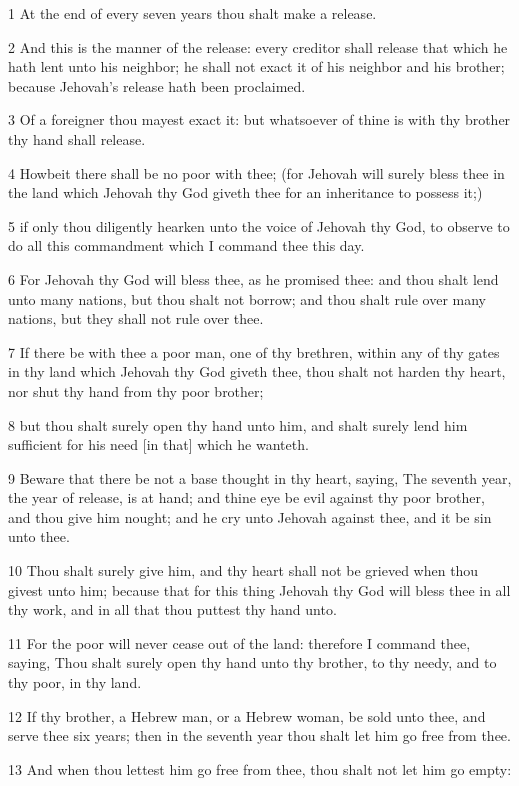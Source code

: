 \par 1 At the end of every seven years thou shalt make a release.
\par 2 And this is the manner of the release: every creditor shall release that which he hath lent unto his neighbor; he shall not exact it of his neighbor and his brother; because Jehovah's release hath been proclaimed.
\par 3 Of a foreigner thou mayest exact it: but whatsoever of thine is with thy brother thy hand shall release.
\par 4 Howbeit there shall be no poor with thee; (for Jehovah will surely bless thee in the land which Jehovah thy God giveth thee for an inheritance to possess it;)
\par 5 if only thou diligently hearken unto the voice of Jehovah thy God, to observe to do all this commandment which I command thee this day.
\par 6 For Jehovah thy God will bless thee, as he promised thee: and thou shalt lend unto many nations, but thou shalt not borrow; and thou shalt rule over many nations, but they shall not rule over thee.
\par 7 If there be with thee a poor man, one of thy brethren, within any of thy gates in thy land which Jehovah thy God giveth thee, thou shalt not harden thy heart, nor shut thy hand from thy poor brother;
\par 8 but thou shalt surely open thy hand unto him, and shalt surely lend him sufficient for his need [in that] which he wanteth.
\par 9 Beware that there be not a base thought in thy heart, saying, The seventh year, the year of release, is at hand; and thine eye be evil against thy poor brother, and thou give him nought; and he cry unto Jehovah against thee, and it be sin unto thee.
\par 10 Thou shalt surely give him, and thy heart shall not be grieved when thou givest unto him; because that for this thing Jehovah thy God will bless thee in all thy work, and in all that thou puttest thy hand unto.
\par 11 For the poor will never cease out of the land: therefore I command thee, saying, Thou shalt surely open thy hand unto thy brother, to thy needy, and to thy poor, in thy land.
\par 12 If thy brother, a Hebrew man, or a Hebrew woman, be sold unto thee, and serve thee six years; then in the seventh year thou shalt let him go free from thee.
\par 13 And when thou lettest him go free from thee, thou shalt not let him go empty:
